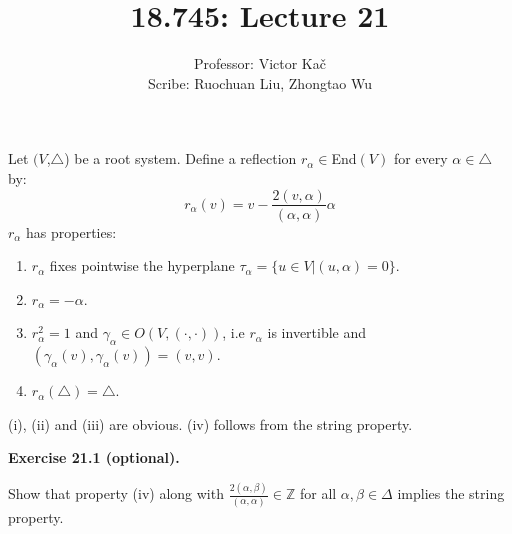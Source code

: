 \documentclass[10pt,twoside]{article}
\title{18.745: Lecture 21}
\author{Professor: Victor Ka\v{c} \\Scribe: Ruochuan Liu, Zhongtao Wu}
\date{}
\newcommand{\Zz}{\mathbb Z}
\theoremstyle{definition}
\theoremstyle{remark}
\newcommand{\exercise}[1]{
	\vspace{9pt}\noindent
	{\bf Exercise #1.}
}
\begin{document}
\maketitle
Let $(V$,$\triangle$) be a root system. Define a reflection
$r_{\alpha}\in $End$(V)$ for every $\alpha\in\triangle$ by:
$$r_{\alpha}(v)=v-\frac{2(v,\alpha)}{(\alpha,\alpha)}\alpha$$
$r_{\alpha}$ has properties:

\renewcommand{\labelenumi}{(\roman{enumi})}
\begin{enumerate}
\item $r_{\alpha}$ fixes pointwise the hyperplane
  $\tau_{\alpha}=\{u\in V|(u,\alpha)=0\}$.
\item $r_{\alpha}=-\alpha$.
\item $r_{\alpha}^{2}=1$ and $\gamma_{\alpha}\in
  O(V,(\cdot,\cdot))$, i.e $r_{\alpha}$ is invertible and
  $(\gamma_{\alpha}(v),\gamma_{\alpha}(v))=(v,v)$.
\item $r_{\alpha}(\triangle)=\triangle$.
\end{enumerate}
(i), (ii) and (iii) are obvious. (iv) follows from the string property.

\exercise{21.1 (optional)}
Show that property (iv) along with $\frac{2(\alpha, \beta)}{(\alpha, \alpha)}\in \Zz$ for all $\alpha, \beta \in \Delta$ implies the string property.
\end{document}
